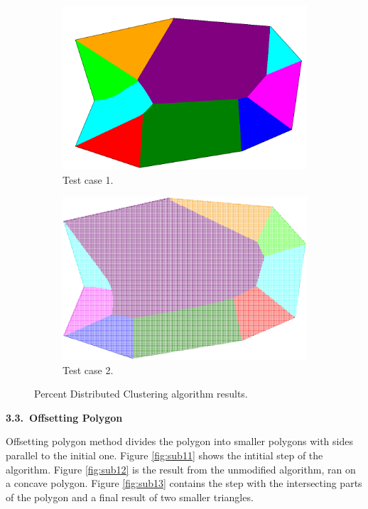 \documentclass[11pt,leqno]{book}
\newcommand{\subsect}[1]{\vskip 3mm\par{\bf#1}}
\begin{document}
\begin{figure}[h!]
\centering
\begin{subfigure}{.5\textwidth}
  \centering
  \includegraphics[width=.5\linewidth]{pic10.png}
  \caption{Test case 1.}
  \label{fig:sub9}
\end{subfigure}%
\begin{subfigure}{.5\textwidth}
  \centering
  \includegraphics[width=.5\linewidth]{pic11.png}
  \caption{Test case 2.}
  \label{fig:sub10}
\end{subfigure}
\caption{Percent Distributed Clustering algorithm results.}
\label{fig:six}
\end{figure}
\FloatBarrier

\subsect{3.3.~Offsetting Polygon}

Offsetting polygon method divides the polygon into smaller polygons with sides parallel to the initial one. Figure \ref{fig:sub11} shows the intitial step of the algorithm. Figure \ref{fig:sub12} is the result from the unmodified algorithm, ran on a concave polygon. Figure \ref{fig:sub13} contains the step with the intersecting parts of the polygon and a final result of two smaller triangles.
\end{document}
